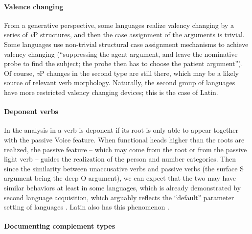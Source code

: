 \documentclass[a4paper, oneside, 12pt]{report}
\newcommand*{\citepages}[1]{pp.~{#1}}
\newcommand{\vP}{\textit{v}P}
\begin{document}
{\paragraph{Valence changing} From a generative perspective, some languages realize valency changing 
by a series of \vP{} structures, and then the case assignment of the arguments is trivial.
Some languages use non-trivial structural case assignment mechanisms
to achieve valency changing 
(``suppressing the agent argument, 
and leave the nominative probe to find the subject;
the probe then has to choose the patient argument'').
Of course, \vP{} changes in the second type are still there,
which may be a likely source of relevant verb morphology.
Naturally, the second group of languages have more restricted valency changing devices;
this is the case of Latin.

\paragraph{Deponent verbs} 
In the analysis in \citet{embick2000features} 
a verb is deponent if its root is only able to 
appear together with the passive Voice feature. 
When functional heads higher than the roots are realized,
the passive feature -- which may come from the root or from the passive light verb -- 
guides the realization of the person and number categories.
Then since the similarity between unaccusative verbs and passive verbs
(the surface S argument being the deep O argument),
we can expect that
the two may have similar behaviors at least in some languages,
which is already demonstrated by second language acquisition,
which arguably reflects the ``default'' parameter setting of languages \citep{balcom1997happened}.
Latin also has this phenomenon \citep[\citepages{308-309}]{oniga2014latin}.

\paragraph{Documenting complement types}

}
\end{document}
